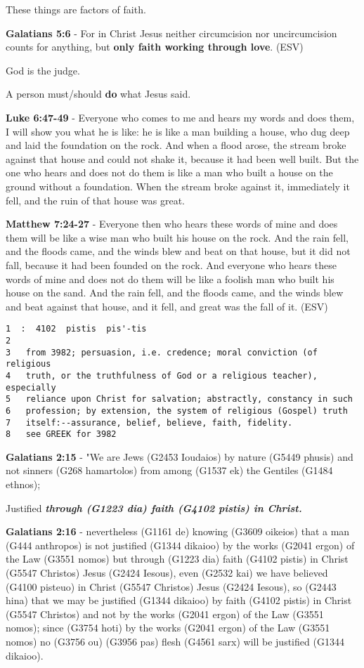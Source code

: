 \documentclass[11pt]{article}
\begin{document}
These things are factors of faith.

\textbf{Galatians 5:6} - For in Christ Jesus neither circumcision nor uncircumcision counts for anything, but \textbf{only faith working through love}. (ESV)

God is the judge.

A person must/should \textbf{do} what Jesus said.

\textbf{Luke 6:47-49} - Everyone who comes to me and hears my words and does them, I will show you what he is like: he is like a man building a house, who dug deep and laid the foundation on the rock. And when a flood arose, the stream broke against that house and could not shake it, because it had been well built.  But the one who hears and does not do them is like a man who built a house on the ground without a foundation. When the stream broke against it, immediately it fell, and the ruin of that house was great.

\textbf{Matthew 7:24-27} - Everyone then who hears these words of mine and does them will be like a wise man who built his house on the rock. And the rain fell, and the floods came, and the winds blew and beat on that house, but it did not fall, because it had been founded on the rock. And everyone who hears these words of mine and does not do them will be like a foolish man who built his house on the sand. And the rain fell, and the floods came, and the winds blew and beat against that house, and it fell, and great was the fall of it. (ESV)

\begin{verbatim}
1  :  4102  pistis  pis'-tis
2  
3   from 3982; persuasion, i.e. credence; moral conviction (of religious
4   truth, or the truthfulness of God or a religious teacher), especially
5   reliance upon Christ for salvation; abstractly, constancy in such
6   profession; by extension, the system of religious (Gospel) truth
7   itself:--assurance, belief, believe, faith, fidelity.
8   see GREEK for 3982
\end{verbatim}

\textbf{Galatians 2:15} - "We are Jews (G2453 Ioudaios) by nature (G5449 phusis) and not sinners (G268 hamartolos) from among (G1537 ek) the Gentiles (G1484 ethnos);

Justified \emph{\textbf{through (G1223 dia) faith (G4102 pistis) in Christ.}}

\textbf{Galatians 2:16} - nevertheless (G1161 de) knowing (G3609 oikeios) that a man (G444 anthropos) is not justified (G1344 dikaioo) by the works (G2041 ergon) of the Law (G3551 nomos) but through (G1223 dia) faith (G4102 pistis) in Christ (G5547 Christos) Jesus (G2424 Iesous), even (G2532 kai) we have believed (G4100 pisteuo) in Christ (G5547 Christos) Jesus (G2424 Iesous), so (G2443 hina) that we may be justified (G1344 dikaioo) by faith (G4102 pistis) in Christ (G5547 Christos) and not by the works (G2041 ergon) of the Law (G3551 nomos); since (G3754 hoti) by the works (G2041 ergon) of the Law (G3551 nomos) no (G3756 ou) (G3956 pas) flesh (G4561 sarx) will be justified (G1344 dikaioo).
\end{document}
